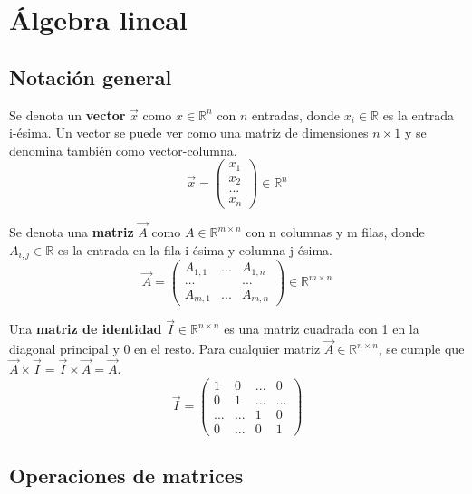 \section{Álgebra lineal}
\subsection{Notación general}
Se denota un \textbf{vector} $\vec{x}$ como $x \in \mathbb{R}^n$ con $n$ entradas, donde $x_i \in \mathbb{R}$ es la entrada i-ésima. Un vector se puede ver como una matriz de dimensiones $n \times 1$ y se denomina también como vector-columna.
$$\vec{x} = \begin{pmatrix}
x_1 \\ x_2 \\ ... \\ x_n
\end{pmatrix} \in \mathbb{R}^n$$

Se denota una \textbf{matriz} $\vec{A}$ como $A \in \mathbb{R}^{m \times n}$ con n columnas y m filas, donde $A_{i,j} \in \mathbb{R}$ es la entrada en la fila i-ésima y columna j-ésima.
$$\vec{A} = \begin{pmatrix}
A_{1,1} & ... & A_{1,n} \\
... & & ...\\
A_{m,1} & ... & A_{m,n}
\end{pmatrix} \in \mathbb{R}^{m \times n}$$

Una \textbf{matriz de identidad} $\vec{I} \in \mathbb{R}^{n \times n}$ es una matriz cuadrada con 1 en la diagonal principal y 0 en el resto. Para cualquier matriz $\vec{A} \in \mathbb{R}^{n \times n}$, se cumple que $\vec{A} \times \vec{I} = \vec{I} \times \vec{A} = \vec{A}$.
$$\vec{I} = \begin{pmatrix}
1 & 0 & ... & 0 \\
0 & 1 & ... & ... \\
... & ... & 1 & 0 \\
0 & ... & 0 & 1
\end{pmatrix}$$

\subsection{Operaciones de matrices}
